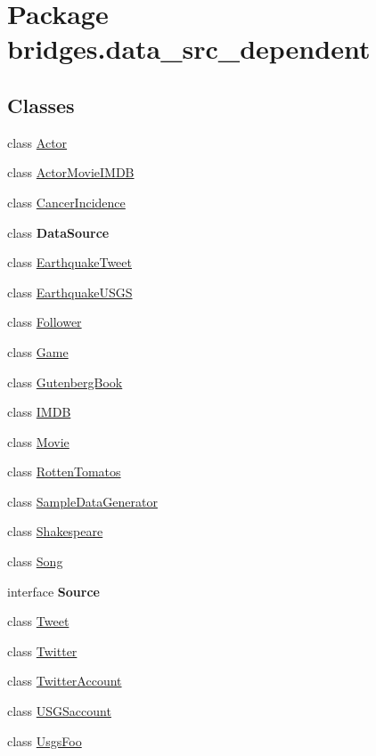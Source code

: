 \hypertarget{namespacebridges_1_1data__src__dependent}{}\section{Package bridges.\+data\+\_\+src\+\_\+dependent}
\label{namespacebridges_1_1data__src__dependent}
\subsection*{Classes}
\begin{DoxyCompactItemize}
\item 
class \hyperlink{classbridges_1_1data__src__dependent_1_1_actor}{Actor}
\item 
class \hyperlink{classbridges_1_1data__src__dependent_1_1_actor_movie_i_m_d_b}{Actor\+Movie\+I\+M\+D\+B}
\item 
class \hyperlink{classbridges_1_1data__src__dependent_1_1_cancer_incidence}{Cancer\+Incidence}
\item 
class {\bfseries Data\+Source}
\item 
class \hyperlink{classbridges_1_1data__src__dependent_1_1_earthquake_tweet}{Earthquake\+Tweet}
\item 
class \hyperlink{classbridges_1_1data__src__dependent_1_1_earthquake_u_s_g_s}{Earthquake\+U\+S\+G\+S}
\item 
class \hyperlink{classbridges_1_1data__src__dependent_1_1_follower}{Follower}
\item 
class \hyperlink{classbridges_1_1data__src__dependent_1_1_game}{Game}
\item 
class \hyperlink{classbridges_1_1data__src__dependent_1_1_gutenberg_book}{Gutenberg\+Book}
\item 
class \hyperlink{classbridges_1_1data__src__dependent_1_1_i_m_d_b}{I\+M\+D\+B}
\item 
class \hyperlink{classbridges_1_1data__src__dependent_1_1_movie}{Movie}
\item 
class \hyperlink{classbridges_1_1data__src__dependent_1_1_rotten_tomatos}{Rotten\+Tomatos}
\item 
class \hyperlink{classbridges_1_1data__src__dependent_1_1_sample_data_generator}{Sample\+Data\+Generator}
\item 
class \hyperlink{classbridges_1_1data__src__dependent_1_1_shakespeare}{Shakespeare}
\item 
class \hyperlink{classbridges_1_1data__src__dependent_1_1_song}{Song}
\item 
interface {\bfseries Source}
\item 
class \hyperlink{classbridges_1_1data__src__dependent_1_1_tweet}{Tweet}
\item 
class \hyperlink{classbridges_1_1data__src__dependent_1_1_twitter}{Twitter}
\item 
class \hyperlink{classbridges_1_1data__src__dependent_1_1_twitter_account}{Twitter\+Account}
\item 
class \hyperlink{classbridges_1_1data__src__dependent_1_1_u_s_g_saccount}{U\+S\+G\+Saccount}
\item 
class \hyperlink{classbridges_1_1data__src__dependent_1_1_usgs_foo}{Usgs\+Foo}
\end{DoxyCompactItemize}
